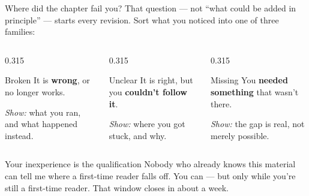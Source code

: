 \documentclass[9pt,aspectratio=169]{beamer}
\begin{document}
\begin{frame}{Where did the chapter fail you?}
    That question --- not ``what could be added in principle'' --- starts every revision. Sort what you noticed into one of three families:

    \vspace{0.75em}

    \begin{columns}[T]
        \begin{column}{0.315\textwidth}
            \begin{block}{\textcolor{tab-red}{Broken}}
                \footnotesize It is \textbf{wrong}, or no longer works.
                \vspace{0.3em}

                \textit{Show:} what you ran, and what happened instead.
            \end{block}
        \end{column}
        \begin{column}{0.315\textwidth}
            \begin{block}{\textcolor{tab-orange}{Unclear}}
                \footnotesize It is right, but you \textbf{couldn't follow it}.
                \vspace{0.3em}

                \textit{Show:} where you got stuck, and why.
            \end{block}
        \end{column}
        \begin{column}{0.315\textwidth}
            \begin{block}{\textcolor{tab-blue}{Missing}}
                \footnotesize You \textbf{needed something} that wasn't there.
                \vspace{0.3em}

                \textit{Show:} the gap is real, not merely possible.
            \end{block}
        \end{column}
    \end{columns}

    \vspace{1em}

    \begin{alertblock}{Your inexperience is the qualification}
        \footnotesize Nobody who already knows this material can tell me where a first-time reader falls off. You can --- but only while you're still a first-time reader. That window closes in about a week.
    \end{alertblock}
\end{frame}
\end{document}

